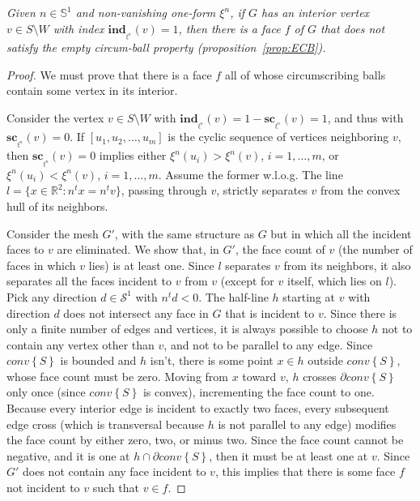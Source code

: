 \documentclass[11pt]{article}
\newcommand{\Sites}{S}
\newcommand{\CHS}{{conv}\left\{\Sites\right\}}
\begin{document}
\emph{
Given $n\in\mathbb{S}^1$ and non-vanishing one-form $\xi^n$, if $G$
has an interior vertex $v\in \Sites\setminus W$ with index
$\mathbf{ind}_{_{\xi^n}}(v)=1$, then there is a face $f$ of
$G$ that does not satisfy the empty circum-ball
property (proposition~\ref{prop:ECB}). 
}
\begin{proof}
We must prove that there is a face $f$ all of whose circumscribing balls
contain some vertex in its interior. 

Consider the vertex $v\in \Sites\setminus W$ with
$\mathbf{ind}_{_{\xi^n}}(v)=1-\mathbf{sc}_{_{\xi^n}}(v)=1$, and thus
with $\mathbf{sc}_{_{\xi^n}}(v)=0$. If $\left[u_1,u_2,\dots,u_m\right]$ is the cyclic sequence of vertices neighboring
$v$, then 
$\mathbf{sc}_{_{\xi^n}}(v)=0$ implies either $\xi^n(u_i)>\xi^n(v)$, $i=1,\dots,m$, or $\xi^n(u_i)<\xi^n(v)$, $i=1,\dots,m$. 
Assume the former w.l.o.g. The line $l=\{x\in\mathbb{R}^2 : n^t x = n^t v\}$, passing through
$v$, strictly separates $v$ from the convex hull of its neighbors. 

Consider the mesh $G'$, with the same structure as $G$ but in which all the incident faces to $v$
are eliminated. 
We show that, in $G'$, the face count of $v$ (the number of faces in which $v$ lies) is at
least one. 
Since $l$ separates $v$ from its neighbors, it also separates all the faces
incident to $v$ from $v$ (except for $v$ itself, which lies on $l$). 
Pick any direction $d\in\mathcal{S}^1$ with $n^t{d} < 0$. 
The half-line $h$ starting at $v$ with direction $d$ does not intersect any face in $G$ that is incident to $v$. 
Since there is only a finite number of edges and vertices, it is always
possible to choose $h$ not to contain any vertex other than $v$, and not to be parallel to any edge. 
Since $\CHS$ is bounded and $h$ isn't, there is
some point $x\in h$ outside $\CHS$, whose face count must be zero. 
Moving from $x$ toward $v$, $h$ crosses $\partial\CHS$ only once 
(since $\CHS$ is convex), incrementing the face count to one. 
Because every interior edge is incident to exactly two faces, 
every subsequent edge cross (which is transversal because $h$ is not
parallel to any edge) modifies the face count by either zero, two, or
minus two. Since the face count cannot be negative, and it is one at 
$h\cap \partial\CHS$, then it must be at least one at $v$. 
Since $G'$ does not contain any face incident to $v$, 
this implies that there is
some face $f$ not incident to $v$ such that $v\in f$. 


\end{proof}
\end{document}

